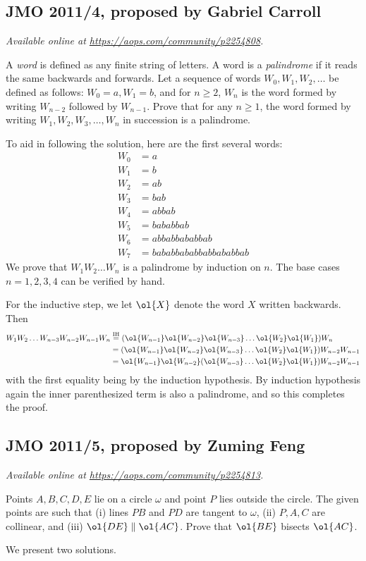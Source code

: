 \documentclass[11pt]{scrartcl}
\begin{document}
\subsection{JMO 2011/4, proposed by Gabriel Carroll}
\textsl{Available online at \url{https://aops.com/community/p2254808}.}
\begin{mdframed}[style=mdpurplebox,frametitle={Problem statement}]
A \emph{word} is defined as any finite string of letters.
A word is a \emph{palindrome} if it reads the same backwards and forwards.
Let a sequence of words $W_0, W_1, W_2, \dots$ be defined as follows:
$W_0 = a, W_1 = b$, and for $n \ge 2$,
$W_n$ is the word formed by writing $W_{n-2}$ followed by $W_{n-1}$.
Prove that for any $n \ge 1$, the word formed by writing
$W_1, W_2, W_3, \dots, W_n$ in succession is a palindrome.
\end{mdframed}
To aid in following the solution, here are the first several words:
\begin{align*}
  W_0 &= a \\
  W_1 &= b \\
  W_2 &= ab \\
  W_3 &= bab \\
  W_4 &= abbab \\
  W_5 &= bababbab \\
  W_6 &= abbabbababbab \\
  W_7 &= bababbababbabbababbab
\end{align*}
We prove that $W_1 W_2 \dots W_n$ is a palindrome by induction on $n$.
The base cases $n=1,2,3,4$ can be verified by hand.

For the inductive step, we let $\ol{X}$ denote the word $X$ written
backwards. Then
\begin{align*}
  W_1 W_2 \dots W_{n-3} W_{n-2} W_{n-1} W_n
  &\overset{\text{IH}}{=} (\ol{W_{n-1}} \ol{W_{n-2}} \ol{W_{n-3}}
    \dots \ol{W_2} \ol{W_1}) W_n \\
  &= (\ol{W_{n-1}} \ol{W_{n-2}} \ol{W_{n-3}}
    \dots \ol{W_2} \ol{W_1}) W_{n-2} W_{n-1} \\
  &= \ol{W_{n-1}} \ol{W_{n-2}} (\ol{W_{n-3}}
    \dots \ol{W_2} \ol{W_1}) W_{n-2} W_{n-1}
\end{align*}
with the first equality being by the induction hypothesis.
By induction hypothesis again the inner parenthesized term
is also a palindrome, and so this completes the proof.
\pagebreak

\subsection{JMO 2011/5, proposed by Zuming Feng}
\textsl{Available online at \url{https://aops.com/community/p2254813}.}
\begin{mdframed}[style=mdpurplebox,frametitle={Problem statement}]
Points $A,B,C,D,E$ lie on a circle $\omega$
and point $P$ lies outside the circle.
The given points are such that
(i) lines $PB$ and $PD$ are tangent to $\omega$,
(ii) $P, A, C$ are collinear,
and (iii) $\ol{DE} \parallel \ol{AC}$.
Prove that $\ol{BE}$ bisects $\ol{AC}$.
\end{mdframed}
We present two solutions.
\end{document}
